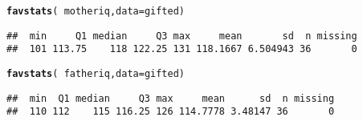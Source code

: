 \documentclass[10pt]{article}\usepackage[]{graphicx}\usepackage[]{color}
\makeatletter
\newcommand{\hlopt}[1]{\textcolor[rgb]{0,0,0}{#1}}%
\newcommand{\hlstd}[1]{\textcolor[rgb]{0.345,0.345,0.345}{#1}}%
\newcommand{\hlkwc}[1]{\textcolor[rgb]{0.333,0.667,0.333}{#1}}%
\newcommand{\hlkwd}[1]{\textcolor[rgb]{0.737,0.353,0.396}{\textbf{#1}}}%
\newenvironment{kframe}{%
 \def\at@end@of@kframe{}%
 \ifinner\ifhmode%
  \def\at@end@of@kframe{\end{minipage}}%
  \begin{minipage}{\columnwidth}%
 \fi\fi%
 \def\FrameCommand##1{\hskip\@totalleftmargin \hskip-\fboxsep
 \colorbox{shadecolor}{##1}\hskip-\fboxsep
     \hskip-\linewidth \hskip-\@totalleftmargin \hskip\columnwidth}%
 \MakeFramed {\advance\hsize-\width
   \@totalleftmargin\z@ \linewidth\hsize
   \@setminipage}}%
 {\par\unskip\endMakeFramed%
 \at@end@of@kframe}
\newenvironment{knitrout}{}{} %
\makeatother
\begin{document}
\begin{knitrout}
\color{fgcolor}\begin{kframe}
\begin{alltt}
\hlkwd{favstats}\hlstd{(}\hlopt{~}\hlstd{motheriq,} \hlkwc{data} \hlstd{= gifted)}
\end{alltt}
\begin{verbatim}
##  min     Q1 median     Q3 max     mean       sd  n missing
##  101 113.75    118 122.25 131 118.1667 6.504943 36       0
\end{verbatim}
\begin{alltt}
\hlkwd{favstats}\hlstd{(}\hlopt{~}\hlstd{fatheriq,} \hlkwc{data} \hlstd{= gifted)}
\end{alltt}
\begin{verbatim}
##  min  Q1 median     Q3 max     mean      sd  n missing
##  110 112    115 116.25 126 114.7778 3.48147 36       0
\end{verbatim}
\end{kframe}
\end{knitrout}
\end{document}
